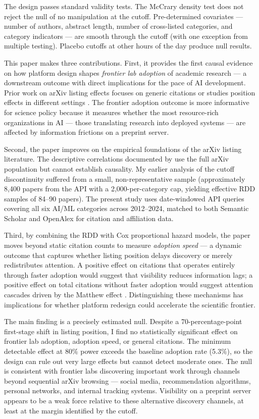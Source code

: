 \documentclass[12pt]{article}
\begin{document}
The design passes standard validity tests. The McCrary density test does not reject the null of no manipulation at the cutoff. Pre-determined covariates --- number of authors, abstract length, number of cross-listed categories, and category indicators --- are smooth through the cutoff (with one exception from multiple testing). Placebo cutoffs at other hours of the day produce null results.

This paper makes three contributions. First, it provides the first causal evidence on how platform design shapes \textit{frontier lab adoption} of academic research --- a downstream outcome with direct implications for the pace of AI development. Prior work on arXiv listing effects focuses on generic citations \citep{haque2009, haque2010, dietrich2008} or studies position effects in different settings \citep{feenberg2017}. The frontier adoption outcome is more informative for science policy because it measures whether the most resource-rich organizations in AI --- those translating research into deployed systems --- are affected by information frictions on a preprint server.

Second, the paper improves on the empirical foundations of the arXiv listing literature. The descriptive correlations documented by \citet{haque2009, haque2010} use the full arXiv population but cannot establish causality. My earlier analysis of the cutoff discontinuity suffered from a small, non-representative sample (approximately 8,400 papers from the API with a 2,000-per-category cap, yielding effective RDD samples of 84--90 papers). The present study uses date-windowed API queries covering all six AI/ML categories across 2012--2024, matched to both Semantic Scholar and OpenAlex for citation and affiliation data.

Third, by combining the RDD with Cox proportional hazard models, the paper moves beyond static citation counts to measure \textit{adoption speed} --- a dynamic outcome that captures whether listing position delays discovery or merely redistributes attention. A positive effect on citations that operates entirely through faster adoption would suggest that visibility reduces information lags; a positive effect on total citations without faster adoption would suggest attention cascades driven by the Matthew effect \citep{merton1968}. Distinguishing these mechanisms has implications for whether platform redesign could accelerate the scientific frontier.

The main finding is a precisely estimated null. Despite a 70-percentage-point first-stage shift in listing position, I find no statistically significant effect on frontier lab adoption, adoption speed, or general citations. The minimum detectable effect at 80\% power exceeds the baseline adoption rate (5.3\%), so the design can rule out very large effects but cannot detect moderate ones. The null is consistent with frontier labs discovering important work through channels beyond sequential arXiv browsing --- social media, recommendation algorithms, personal networks, and internal tracking systems. Visibility on a preprint server appears to be a weak force relative to these alternative discovery channels, at least at the margin identified by the cutoff.
\end{document}
